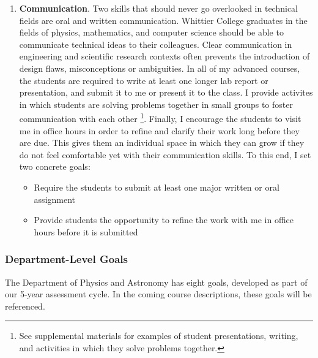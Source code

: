 \documentclass[../../main.tex]{subfiles}
\begin{document}
\begin{enumerate}
\item \textbf{Communication}.  Two skills that should never go overlooked in technical fields are oral and written communication.  Whittier College graduates in the fields of physics, mathematics, and computer science should be able to communicate technical ideas to their colleagues.  Clear communication in engineering and scientific research contexts often prevents the introduction of design flaws, misconceptions or ambiguities.  In all of my advanced courses, the students are required to write at least one longer lab report or presentation, and submit it to me or present it to the class.  I provide activites in which students are solving problems together in small groups to foster communication with each other \footnote{See supplemental materials for examples of student presentations, writing, and activities in which they solve problems together.}.  Finally, I encourage the students to visit me in office hours in order to refine and clarify their work long before they are due.  This gives them an individual space in which they can grow if they do not feel comfortable yet with their communication skills.  To this end, I set two concrete goals:

\begin{itemize}
\item Require the students to submit at least one major written or oral assignment
\item Provide students the opportunity to refine the work with me in office hours before it is submitted %
\end{itemize}

\end{enumerate}

\subsubsection{Department-Level Goals}

The Department of Physics and Astronomy has eight goals, developed as part of our 5-year assessment cycle. In the coming course descriptions, these goals will be referenced.
\end{document}
